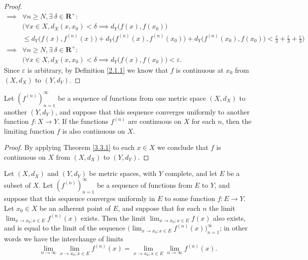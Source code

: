 \begin{proof}
\begin{align*}
        \implies & \forall n \geq N, \exists\ \delta \in \mathbf{R}^+ :                                                                                                                                        \\
                 & \Big(\forall x \in X, d_X(x, x_0) < \delta \implies d_Y\big(f(x), f(x_0)\big)                                                                                                               \\
                 & \leq d_Y\big(f(x), f^{(n)}(x)\big) + d_Y\big(f^{(n)}(x), f^{(n)}(x_0)\big) + d_Y\big(f^{(n)}(x_0), f(x_0)\big) < \frac{\varepsilon}{3} + \frac{\varepsilon}{3} + \frac{\varepsilon}{3}\Big) \\
        \implies & \forall n \geq N, \exists\ \delta \in \mathbf{R}^+ :                                                                                                                                        \\
                 & \Big(\forall x \in X, d_X(x, x_0) < \delta \implies d_Y\big(f(x), f(x_0)\big) < \varepsilon.
    \end{align*}
    Since \(\varepsilon\) is arbitrary, by Definition \ref{2.1.1} we know that \(f\) is continuous at \(x_0\) from \((X, d_X)\) to \((Y, d_Y)\).
\end{proof}

\begin{corollary}\label{3.3.2}
    Let \((f^{(n)})_{n = 1}^\infty\) be a sequence of functions from one metric space \((X, d_X)\) to another \((Y, d_Y)\), and suppose that this sequence converges uniformly to another function \(f : X \to Y\).
    If the functions \(f^{(n)}\) are continuous on \(X\) for each \(n\), then the limiting function \(f\) is also continuous on \(X\).
\end{corollary}

\begin{proof}
    By applying Theorem \ref{3.3.1} to each \(x \in X\) we conclude that \(f\) is continuous on \(X\) from \((X, d_X)\) to \((Y, d_Y)\).
\end{proof}

\begin{proposition}\label{3.3.3}
    Let
    \((X, d_X)\) and \((Y, d_Y)\) be metric spaces, with \(Y\) complete, and let \(E\) be a subset of \(X\).
    Let \((f^{(n)})_{n = 1}^\infty\) be a sequence of functions from \(E\) to \(Y\), and suppose that this sequence converges uniformly in \(E\) to some function \(f : E \to Y\).
    Let \(x_0 \in X\) be an adherent point of \(E\), and suppose that for each \(n\) the limit \(\lim_{x \to x_0 ; x \in E} f^{(n)}(x)\) exists.
    Then the limit \(\lim_{x \to x_0 ; x \in E} f(x)\) also exists, and is equal to the limit of the sequence \(\big(\lim_{x \to x_0 ; x \in E} f^{(n)}(x)\big)_{n = 1}^\infty\);
    in other words we have the interchange of limits
    \[
        \lim_{n \to \infty} \lim_{x \to x_0 ; x \in E} f^{(n)}(x) = \lim_{x \to x_0 ; x \in E} \lim_{n \to \infty} f^{(n)}(x).
    \]
\end{proposition}

